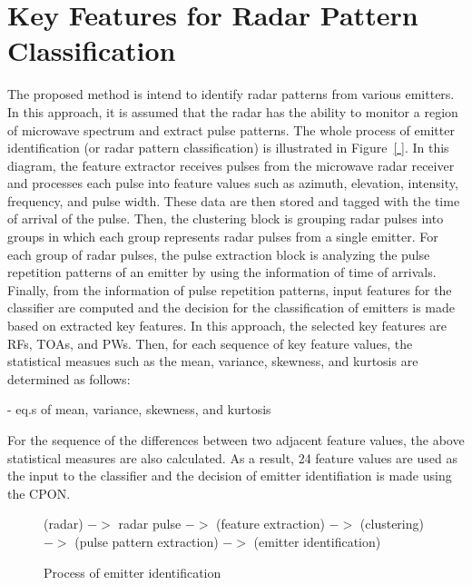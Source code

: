 \documentclass[runningheads,a4paper]{llncs}
\begin{document}
\section{Key Features for Radar Pattern Classification}

The proposed method is intend to identify radar patterns from various emitters. In this approach, it is assumed that the radar has the ability to monitor
a region of microwave spectrum and extract pulse patterns. The whole process of emitter identification (or radar pattern classification) is illustrated
in Figure~\ref{ }. In this diagram, the feature extractor receives pulses from the microwave radar receiver and processes each pulse into
feature values such as azimuth, elevation, intensity, frequency, and pulse width. These data are then stored and tagged with the time of arrival of the pulse.
Then, the clustering block is grouping radar pulses into groups in which each group represents radar pulses from a single emitter. For each group of
radar pulses, the pulse extraction block is analyzing the pulse repetition patterns of an emitter by using the information of time of arrivals. Finally,
from the information of pulse repetition patterns, input features for the classifier are computed and the decision for the classification of emitters
is made based on extracted key features. In this approach, the selected key features are RFs, TOAs, and PWs. Then, for each sequence of key feature
values, the statistical measues such as the mean, variance, skewness, and kurtosis are determined as follows:

- eq.s of mean, variance, skewness, and kurtosis

\vspace{5em}

For the sequence of the differences between two adjacent feature values, the above statistical measures are also calculated. As a result,
24 feature values are used as the input to the classifier and the decision of emitter identifiation is made using the CPON.

\begin{figure}
\centering

\vspace{5em}

(radar) $->$ radar pulse $->$ (feature extraction) $->$ (clustering) $->$ (pulse pattern extraction) $->$ (emitter identification)

\caption{Process of emitter identification}
\label{fig:my_label}
\end{figure}
\end{document}
